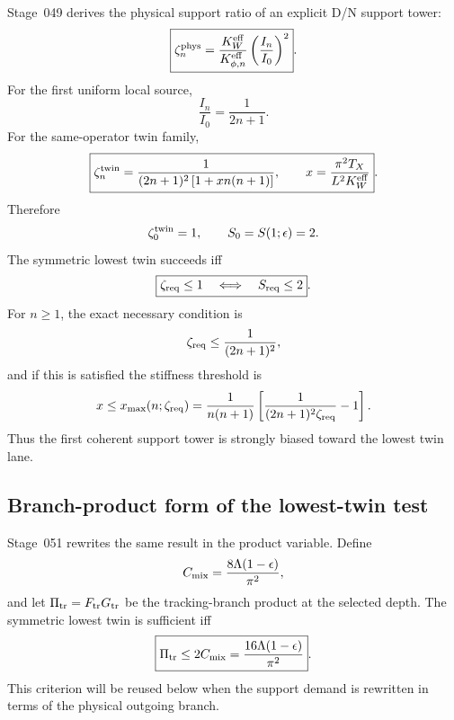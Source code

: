Stage~049 derives the physical support ratio of an explicit D/N support tower:
\begin{equation}
\label{eq:part03-zeta-phys-general}
\boxed{
\zeta_n^{\rm phys}=\frac{K_W^{\rm eff}}{K_{\phi,n}^{\rm eff}}
\left(\frac{I_n}{I_0}\right)^2}.
\end{equation}
For the first uniform local source,
\begin{equation}
\label{eq:part03-In-ratio}
\frac{I_n}{I_0}=\frac{1}{2n+1}.
\end{equation}
For the same-operator twin family,
\begin{equation}
\label{eq:part03-zeta-twin}
\boxed{
\zeta_n^{\rm twin}=\frac{1}{(2n+1)^2\left[1+xn(n+1)\right]},
\qquad
x=\frac{\pi^2T_X}{L^2K_W^{\rm eff}}}.
\end{equation}
Therefore
\begin{equation}
\label{eq:part03-lowest-twin}
\zeta_0^{\rm twin}=1,
\qquad
S_0=S(1;\epsilon)=2.
\end{equation}
The symmetric lowest twin succeeds iff
\begin{equation}
\label{eq:part03-lowest-twin-iff}
\boxed{
\zeta_{\rm req}\leq1
\quad\Longleftrightarrow\quad
S_{\rm req}\leq2}.
\end{equation}
For \(n\geq1\), the exact necessary condition is
\begin{equation}
\label{eq:part03-higher-harmonic-bound}
\zeta_{\rm req}\leq\frac{1}{(2n+1)^2},
\end{equation}
and if this is satisfied the stiffness threshold is
\begin{equation}
\label{eq:part03-xmax}
x\leq x_{\max}(n;\zeta_{\rm req})
=\frac{1}{n(n+1)}\left[\frac{1}{(2n+1)^2\zeta_{\rm req}}-1\right].
\end{equation}
Thus the first coherent support tower is strongly biased toward the lowest twin lane.

\subsection{Branch-product form of the lowest-twin test}
\label{subsec:part03-lowest-twin-product}

Stage~051 rewrites the same result in the product variable.  Define
\begin{equation}
\label{eq:part03-Cmix}
C_{\rm mix}=\frac{8\Lambda(1-\epsilon)}{\pi^2},
\end{equation}
and let \(\Pi_{\rm tr}=F_{\rm tr}G_{\rm tr}\) be the tracking-branch product at the selected depth.  The symmetric lowest twin is sufficient iff
\begin{equation}
\label{eq:part03-twin-product-criterion}
\boxed{
\Pi_{\rm tr}\leq2C_{\rm mix}
=\frac{16\Lambda(1-\epsilon)}{\pi^2}}.
\end{equation}
This criterion will be reused below when the support demand is rewritten in terms of the physical outgoing branch.

